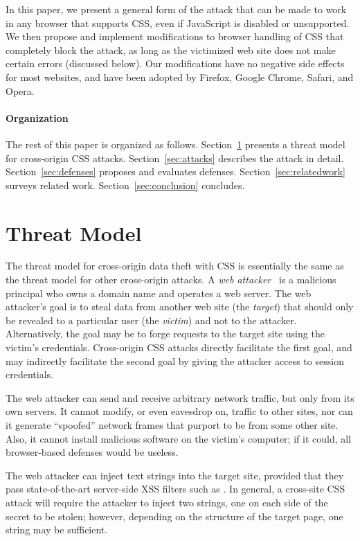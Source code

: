 \documentclass{acm_proc_article-sp}
\begin{document}
In this paper, we present a general form of the attack that can be
made to work in any browser that supports CSS, even if JavaScript is
disabled or unsupported.  We then propose and implement modifications
to browser handling of CSS that completely block the attack, as long
as the victimized web site does not make certain errors (discussed
below).  Our modifications have no negative side effects for most
websites, and have been adopted by Firefox, Google Chrome, Safari, and
Opera.

\paragraph{Organization}
The rest of this paper is organized as follows. Section~\ref{sec:threatmodel} presents a threat model for cross-origin CSS attacks.
Section~\ref{sec:attacks} describes the attack in detail. Section~\ref{sec:defenses} proposes and evaluates defenses.
Section~\ref{sec:relatedwork} surveys related work.
Section~\ref{sec:conclusion} concludes.

\section{Threat Model} \label{sec:threatmodel}

The threat model for cross-origin data theft with CSS is essentially
the same as the threat model for other cross-origin attacks.  A
\emph{web attacker}~\cite{jackson09thesis} is a malicious principal
who owns a domain name and operates a web server.  The web attacker's
goal is to steal data from another web site (the \emph{target}) that
should only be revealed to a particular user (the \emph{victim}) and
not to the attacker.  Alternatively, the goal may be to forge requests
to the target site using the victim's credentials.  Cross-origin CSS
attacks directly facilitate the first goal, and may indirectly
facilitate the second goal by giving the attacker access to session
credentials.

The web attacker can send and receive arbitrary network traffic, but
only from its own servers.  It cannot modify, or even eavesdrop on,
traffic to other sites, nor can it generate “spoofed” network frames
that purport to be from some other site.  Also, it cannot install
malicious software on the victim's computer; if it could, all
browser-based defenses would be useless.

The web attacker can inject text strings into the target site,
provided that they pass state-of-the-art server-side XSS filters such
as \cite{htmlpurifier}.  In general, a cross-site CSS attack will
require the attacker to inject two strings, one on each side of the
secret to be stolen; however, depending on the structure of the target
page, one string may be sufficient.
\end{document}
